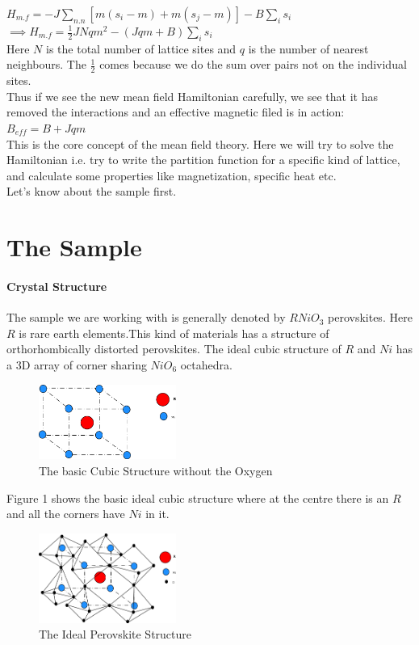 \documentclass[20pt]{article}
\begin{document}
$H_{m.f} = -J \sum_{n.n} [m (s_i - m) + m (s_j - m)] - B \sum_{i} s_i$\\

$\implies H_{m.f} = \frac{1}{2} J N q m^2 - (J q m + B)\sum_{i} s_i $ \\

Here $N$ is the total number of lattice sites and $q$ is the number of nearest neighbours. The $\frac{1}{2}$ comes because we do the sum over pairs not on the individual sites.\\
Thus if we see the new mean field Hamiltonian carefully, we see that it has removed the interactions and an effective magnetic filed is in action:\\
$B_{eff} = B + J q m$\\

This is the core concept of the mean field theory. Here we will try to solve the Hamiltonian i.e. try to write the partition function for a specific kind of lattice, and calculate some properties like magnetization, specific heat etc.\\
Let's know about the sample first.\\

\section*{The Sample}
\paragraph{ Crystal Structure\\}
The sample we are working with is generally denoted by $RNiO_3$ perovskites. Here $R$ is rare earth elements.This kind of materials has a structure of orthorhombically distorted perovskites. The ideal cubic structure of $R$ and $Ni$ has a 3D array of  corner sharing $Ni O_6$ octahedra.

\begin{figure}[h!]
\centering
	\includegraphics[width=0.4\textwidth]{RNiO3_2.png}
	\caption{The basic Cubic Structure without the Oxygen}
	\end{figure}
	
Figure 1 shows the basic ideal cubic structure where at the centre there is an $R$ and all the corners have $Ni$ in it.
\begin{figure}[h!]
\centering
	\includegraphics[width=0.4\textwidth]{RNiO3.png}
	\caption{The Ideal Perovskite Structure }
	\end{figure}
\end{document}
